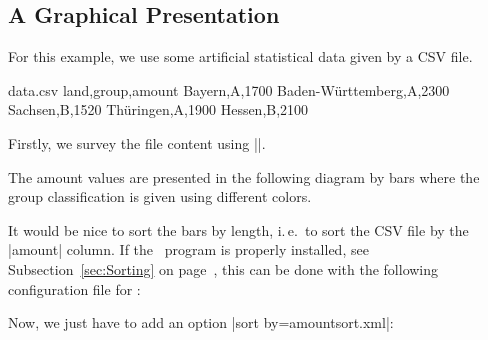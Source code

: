 \documentclass[a4paper,11pt]{ltxdoc}
\begin{document}
\clearpage
\subsection{A Graphical Presentation}%
For this example, we use some artificial statistical data given by a CSV file.

\begin{tcbverbatimwrite}{data.csv}
land,group,amount
Bayern,A,1700
Baden-Württemberg,A,2300
Sachsen,B,1520
Thüringen,A,1900
Hessen,B,2100
\end{tcbverbatimwrite}


Firstly, we survey the file content using
|\csvautobooktabular|.

\begin{dispExample}
\end{dispExample}

The amount values are presented in the following diagram by bars where
the group classification is given using different colors.

\begin{dispExample}
\end{dispExample}


\clearpage
It would be nice to sort the bars by length, i.\,e.\ to sort the CSV file
by the |amount| column. If the \csvsorter\ program is properly installed,
see Subsection~\ref{sec:Sorting} on page~\pageref{sec:Sorting},
this can be done with the following configuration file for \csvsorter:


Now, we just have to add an option |sort by=amountsort.xml|:
\begin{dispExample}
\end{dispExample}
\end{document}
